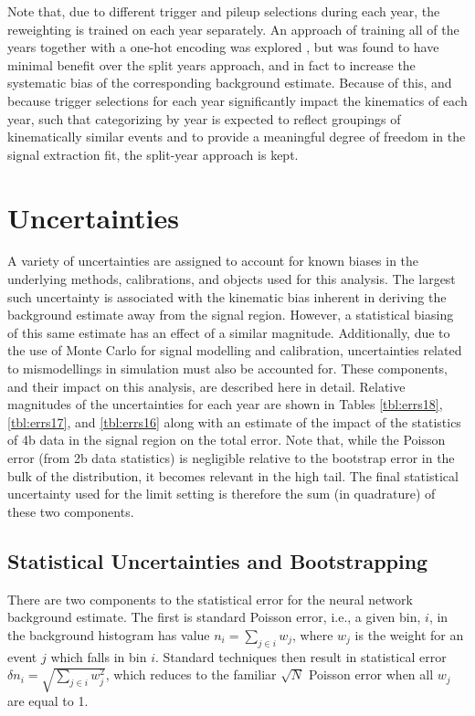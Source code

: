 Note that, due to different trigger and pileup selections during each year, 
the reweighting is trained on each year separately. An approach of training all of the years 
together with a one-hot encoding was explored , but was found to have minimal 
benefit over the split years approach, and in fact to increase 
the systematic bias of the corresponding background estimate.
Because of this, and because trigger selections for each year significantly impact the kinematics of each year, 
such that categorizing by year is expected to reflect groupings of kinematically similar events and 
to provide a meaningful degree of freedom in the signal extraction fit, the split-year approach is
kept.

\section{Uncertainties}
A variety of uncertainties are assigned to account for known biases in the
underlying methods, calibrations, and objects used for this analysis. The
largest such uncertainty is associated with the kinematic bias inherent in
deriving the background estimate away from the signal region. However, a
statistical biasing of this same estimate has an effect of a similar magnitude.
Additionally, due to the use of Monte Carlo for signal modelling and \btag
calibration, uncertainties related to mismodellings in simulation must also be
accounted for. These components, and their impact on this analysis, are
described here in detail. Relative magnitudes of the uncertainties for
each year are shown in Tables \ref{tbl:errs18}, \ref{tbl:errs17}, and
\ref{tbl:errs16} along with an estimate of the impact of the statistics of 4b
data in the signal region on the total error. Note that, while the Poisson
error (from 2b data statistics) is negligible relative to the bootstrap error 
in the bulk of the distribution, it becomes relevant in the high \mhh tail. 
The final statistical uncertainty used for the limit setting is therefore the 
sum (in quadrature) of these two components. 

%	

\subsection{Statistical Uncertainties and Bootstrapping}
There are two components to the statistical error for the neural network
background estimate. The first is standard Poisson error, i.e., a given bin,
$i$, in the background histogram has value $n_i = \sum\limits_{j\in i} w_j$,
where $w_j$ is the weight for an event $j$ which falls in bin $i$. Standard
techniques then result in statistical error $\delta n_i =
	\sqrt{\sum\limits_{j\in i} w_j^2}$, which reduces to the familiar $\sqrt{N}$
Poisson error when all $w_j$ are equal to 1.

